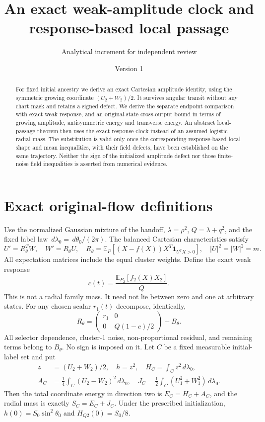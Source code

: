 \documentclass[11pt]{article}
\title{An exact weak-amplitude clock and response-based local passage}
\author{Analytical increment for independent review}\date{Version 1}
\numberwithin{equation}{section}
\theoremstyle{remark}\newtheorem{remark}[theorem]{Remark}
\newcommand{\dd}{\,d}\newcommand{\E}{\mathbb E}\newcommand{\R}{\mathbb R}
\begin{document}
\maketitle
\begin{abstract}
For fixed initial ancestry we derive an exact Cartesian amplitude identity, using the symmetric growing coordinate $(U_2+W_2)/2$. It survives angular transit without any chart mask and retains a signed defect. We derive the separate endpoint comparison with exact weak response, and an original-state cross-output bound in terms of growing amplitude, antisymmetric energy and transverse energy. An abstract local-passage theorem then uses the exact response clock instead of an assumed logistic radial mass. The substitution is valid only once the corresponding response-based local shape and mean inequalities, with their field defects, have been established on the same trajectory. Neither the sign of the initialized amplitude defect nor those finite-noise field inequalities is asserted from numerical evidence.
\end{abstract}

\section{Exact original-flow definitions}\label{inc:AN03:clock:v1:definitions}
Use the normalized Gaussian mixture of the handoff, $\lambda=\rho^2$,
$Q=\lambda+q^2$, and the fixed label law $\dd\lambda_0=\dd\theta_0/(2\pi)$.
The balanced Cartesian characteristics satisfy
\[
 U'=R_\theta^TW,\quad W'=R_\theta U,\quad
 R_\theta=\E_P[(X-f(X))X^T\mathbf1_{U^TX>0}],\quad |U|^2=|W|^2=m.
\]
All expectation matrices include the equal cluster weights. Define the exact weak response
\begin{equation}\label{inc:AN03:clock:v1:c}
 c(t)=\frac{\E_{P_2}[f_2(X)X_2]}{Q}.
\end{equation}
This is not a radial family mass. It need not lie between zero and one at arbitrary states.
For any chosen scalar $r_1(t)$ decompose, identically,
\begin{equation}\label{inc:AN03:clock:v1:split}
 R_\theta=\begin{pmatrix}r_1&0\\0&Q(1-c)/2\end{pmatrix}+B_\theta.
\end{equation}
All selector dependence, cluster-1 noise, non-proportional residual, and remaining terms belong to $B_\theta$. No sign is imposed on it.
Let $C$ be a fixed measurable initial-label set and put
\begin{align}
 z&=(U_2+W_2)/2,\quad h=z^2,\quad H_C=\int_C z^2\dd\lambda_0,\label{inc:AN03:clock:v1:H}\\
 A_C&=\frac14\int_C(U_2-W_2)^2\dd\lambda_0,\quad
 J_C=\frac12\int_C(U_1^2+W_1^2)\dd\lambda_0.\nonumber
\end{align}
Then the total coordinate energy in direction two is $E_C=H_C+A_C$, and the radial mass is exactly $S_C=E_C+J_C$.
Under the prescribed initialization, $h(0)=S_0\sin^2\theta_0$ and $H_{Q2}(0)=S_0/8$.
\end{document}
